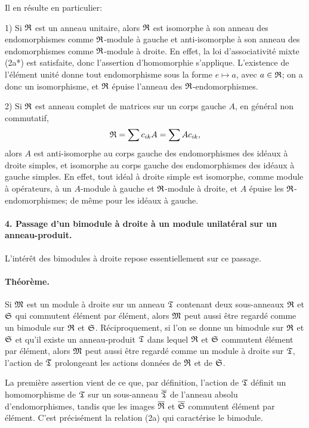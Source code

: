 Il en résulte en particulier:

1) Si \(\mathfrak R\) est un anneau unitaire, alors \(\mathfrak R\) est isomorphe à son anneau des endomorphismes comme \(\mathfrak R\)-module à gauche et anti-isomorphe à son anneau des endomorphismes comme \(\mathfrak R\)-module à droite. En effet, la loi d'associativité mixte (2a*) est satisfaite, donc l'assertion d'homomorphie s'applique. L'existence de l'élément unité donne tout endomorphisme sous la forme \(e\mapsto a\), avec \(a\in\mathfrak R\); on a donc un isomorphisme, et \(\mathfrak R\) épuise l'anneau des \(\mathfrak R\)-endomorphismes.

2) Si \(\mathfrak R\) est anneau complet de matrices sur un corps gauche \(A\), en général non commutatif,
\[
        \mathfrak R=\sum c_{ik}A=\sum A c_{ik},
\]
alors \(A\) est anti-isomorphe au corps gauche des endomorphismes des idéaux à droite simples, et isomorphe au corps gauche des endomorphismes des idéaux à gauche simples. En effet, tout idéal à droite simple est isomorphe, comme module à opérateurs, à un \(A\)-module à gauche et \(\mathfrak R\)-module à droite, et \(A\) épuise les \(\mathfrak R\)-endomorphismes; de même pour les idéaux à gauche.

\paragraph{4. Passage d'un bimodule à droite à un module unilatéral sur un anneau-produit.}
L'intérêt des bimodules à droite repose essentiellement sur ce passage.

\paragraph{Théorème.}
Si \(\mathfrak M\) est un module à droite sur un anneau \(\mathfrak T\) contenant deux sous-anneaux \(\mathfrak R\) et \(\mathfrak S\) qui commutent élément par élément, alors \(\mathfrak M\) peut aussi être regardé comme un bimodule sur \(\mathfrak R\) et \(\mathfrak S\). Réciproquement, si l'on se donne un bimodule sur \(\mathfrak R\) et \(\mathfrak S\) et qu'il existe un anneau-produit \(\mathfrak T\) dans lequel \(\mathfrak R\) et \(\mathfrak S\) commutent élément par élément, alors \(\mathfrak M\) peut aussi être regardé comme un module à droite sur \(\mathfrak T\), l'action de \(\mathfrak T\) prolongeant les actions données de \(\mathfrak R\) et de \(\mathfrak S\).

La première assertion vient de ce que, par définition, l'action de \(\mathfrak T\) définit un homomorphisme de \(\mathfrak T\) sur un sous-anneau \(\overline{\mathfrak T}\) de l'anneau absolu d'endomorphismes, tandis que les images \(\overline{\mathfrak R}\) et \(\overline{\mathfrak S}\) commutent élément par élément. C'est précisément la relation (2a) qui caractérise le bimodule.

